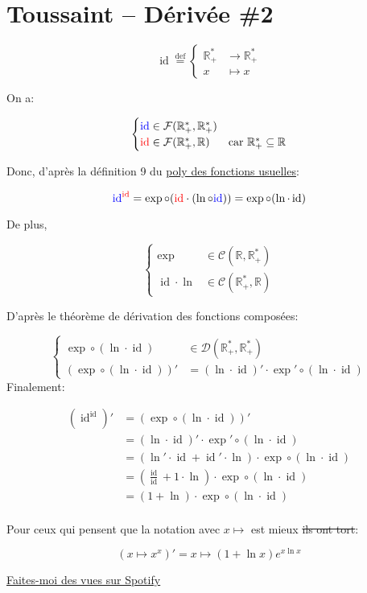 \documentclass{article}
\newcommand{\R}{\mathbb{R}}
\newcommand{\id}{\operatorname{id}}
\newcommand{\cC}{\mathcal{C}}
\newcommand{\dD}{\mathcal{D}}
\newcommand{\fF}{\mathcal{F}}
\begin{document}
\pagestyle{empty}

\section*{Toussaint -- Dérivée \#2}

\[
	\id \stackrel{\text{def}}{=} \begin{cases}
		\R_+^\ast &\to \R_+^\ast \\
		x &\mapsto x
	\end{cases}
\]

On a:

\[
	\begin{cases}
		{\color{blue}\id} \in \fF(\R_+^\ast, \R_+^\ast) \\
		{\color{red}\id} \in \fF(\R_+^\ast, \R) & \text{car}\ \R_+^\ast \subseteq \R
	\end{cases}
\] 

Donc, d'après la définition 9 du \href{http://mpsi.daudet.free.fr/maths/polys/cours/FonctionsUsuelles/Fonctions_usuelles.pdf}{\underline{poly des fonctions usuelles}}:

\[
	{\color{blue} \id^{\color{red}{\id}}} = \exp \circ ({\color{red}\id} \cdot (\ln \circ {\color{blue}\id})) = \exp \circ (\ln \cdot \id)
\] 

De plus,

\[
	\begin{cases}
		\exp &\in \cC(\R, \R_+^\ast) \\
		\id \cdot \ln &\in \cC(\R_+^\ast, \R)
	\end{cases}
\] 

D'après le théorème de dérivation des fonctions composées:

\[
	\begin{cases}
		\exp \circ (\ln \cdot \id) &\in \dD(\R_+^\ast, \R_+^\ast) \\
		(\exp\circ(\ln \cdot \id))' &= (\ln \cdot \id)' \cdot \exp' \circ (\ln \cdot \id)
	\end{cases}
\] 
Finalement:

\begin{align*}
	(\id^{\id})' &= (\exp\circ(\ln \cdot \id))' \\
	&= (\ln \cdot \id)' \cdot \exp' \circ (\ln \cdot \id) \\
	&= (\ln' \cdot \id + \id' \cdot \ln) \cdot \exp\circ(\ln \cdot \id) \\
	&= \left(\frac{\id}{\id} + 1 \cdot \ln\right) \cdot  \exp\circ(\ln \cdot \id)\\
	&= (1+\ln) \cdot  \exp\circ(\ln \cdot \id)\\
\end{align*}

Pour ceux qui pensent que la notation avec $x\mapsto $ est mieux \st{ils ont tort}:

\[
	(x\mapsto x^x)' = x\mapsto (1+\ln x)e^{x \ln x}
\] 
\vfill
\begin{center}
	
{\tiny \href{https://open.spotify.com/artist/6tUc6r8aNeiiT1mElcnMx9?si=dIYSUMDrT_uH0d0yJEZnrw}{\underline{Faites-moi des vues sur Spotify}}}

\end{center}
\end{document}
